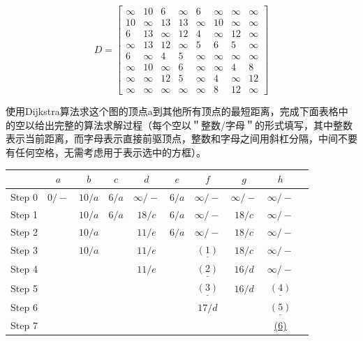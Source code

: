 \documentclass[UTF8, heading=true]{ctexart}
\begin{document}
\begin{table}[H]
  \renewcommand{\arraystretch}{1.5}
  \centering
$$
D=\left[\begin{array}{cccccccc}
\infty & 10 & 6 & \infty & 6 & \infty & \infty & \infty \\
10 & \infty & 13 & 13 & \infty & 10 & \infty & \infty \\
6 & 13 & \infty & 12 & 4 & \infty & 12 & \infty \\
\infty & 13 & 12 & \infty & 5 & 6 & 5 & \infty \\
6 & \infty & 4 & 5 & \infty & \infty & \infty & \infty \\
\infty & 10 & \infty & 6 & \infty & \infty & 4 & 8 \\
\infty & \infty & 12 & 5 & \infty & 4 & \infty & 12 \\
\infty & \infty & \infty & \infty & \infty & 8 & 12 & \infty
\end{array}\right]
$$
\end{table}

使用Dijkstra算法求这个图的顶点a到其他所有顶点的最短距离，完成下面表格中的空以给出完整的算法求解过程（每个空以＂整数/字母＂的形式填写，其中整数表示当前距离，而字母表示直接前驱顶点，整数和字母之间用斜杠分隔，中间不要有任何空格，无需考虑用于表示选中的方框）。

\begin{table}[H]
  \renewcommand{\arraystretch}{1.5}
  \centering
  \begin{tabular}{c|c|c|c|c|c|c|c|c|c}
    \hline
    & $a$ & $b$ & $c$ & $d$ & $e$ & $f$ & $g$ & $h$ \\
    \hline
    Step 0 & $\boxed{0}/-$ & $10 / a$ & $6 / a$ & $\infty /-$ & $6 / a$ & $\infty /-$ & $\infty /-$ & $\infty /-$ \\
    \hline
    Step 1 &  & $10 / a$ & $\boxed{6} / a$ & $18 / c$ & $6/a$ & $\infty /-$ & $18/c$ & $\infty /-$ \\
    \hline
    Step 2 &  & $10 / a$ &  & $11 / e$ & $\boxed{6} /a$ & $\infty /-$ & $18/c$ & $\infty/-$ \\
    \hline
    Step 3 & & $\boxed{10} / a$ &  & $11/e$ &  & $\underline{(1)}$ & $18 /c$ & $\infty /-$ \\
    \hline
    Step 4 & &  & & $\boxed{11} / e$ &  & $\underline{(2)}$ & $16 /d$ & $\infty /-$ \\
    \hline
    Step 5 & &  & &  &  & $\underline{(3)}$ & $\boxed{16} / d$ & $\underline{(4)}$ \\
    \hline
    Step 6 & & & & & & $\boxed{17} / d$ &  & $\underline{(5)}$ \\
    \hline
    Step 7 & &  & & & & & & \underline{(6)} \\
    \hline
  \end{tabular}
\end{table}
\end{document}
